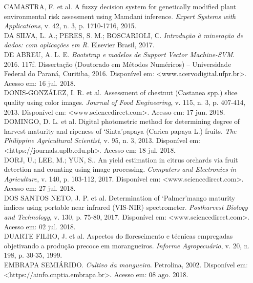 \noindent CAMASTRA, F. et al. A fuzzy decision system for genetically modified plant environmental risk assessment using Mamdani inference. \textit{Expert Systems with Applications}, v. 42, n. 3, p. 1710-1716, 2015.
\\

\noindent DA SILVA, L. A.; PERES, S. M.; BOSCARIOLI, C. \textit{Introdução à mineração de dados: com aplicações em R}. Elsevier Brasil, 2017.
\\

\noindent DE ABREU, A. L. E. \textit{Bootstrap e modelos de Support Vector Machine-SVM}. 2016. 117f. Dissertação (Doutorado em Métodos Numéricos) – Universidade Federal do Paraná, Curitiba, 2016. Disponível em: <www.acervodigital.ufpr.br>. Acesso em: 16 jul. 2018.
\\

\noindent DONIS-GONZÁLEZ, I. R. et al. Assessment of chestnut (Castanea spp.) slice quality using color images. \textit{Journal of Food Engineering}, v. 115, n. 3, p. 407-414, 2013. Disponível em: <www.sciencedirect.com>. Acesso em: 17 jun. 2018.
\\

\noindent DOMINGO, D. L. et al. Digital photometric method for determining degree of harvest maturity and ripeness of ‘Sinta’papaya (Carica papaya L.) fruits. \textit{The Philippine Agricultural Scientist}, v. 95, n. 3, 2013. Disponível em: <https://journals.uplb.edu.ph>. Acesso em: 18 jul. 2018.
\\

\noindent DORJ, U.; LEE, M.; YUN, S.. An yield estimation in citrus orchards via fruit detection and counting using image processing. \textit{Computers and Electronics in Agriculture}, v. 140, p. 103-112, 2017. Disponível em: <www.sciencedirect.com>. Acesso em: 27 jul. 2018.
\\

\noindent DOS SANTOS NETO, J. P. et al. Determination of ‘Palmer’mango maturity indices using portable near infrared (VIS-NIR) spectrometer. \textit{Postharvest Biology and Technology}, v. 130, p. 75-80, 2017. Disponível em: <www.sciencedirect.com>. Acesso em: 02 jul. 2018. 
\\

\noindent DUARTE FILHO, J. et al. Aspectos do florescimento e técnicas empregadas objetivando a produção precoce em morangueiros. \textit{Informe Agropecuário}, v. 20, n. 198, p. 30-35, 1999. 
\\

\noindent EMBRAPA SEMIÁRIDO. \textit{Cultivo da mangueira}. Petrolina, 2002. Disponível em: \\ <https://ainfo.cnptia.embrapa.br>. Acesso em: 08 ago. 2018.
\\

